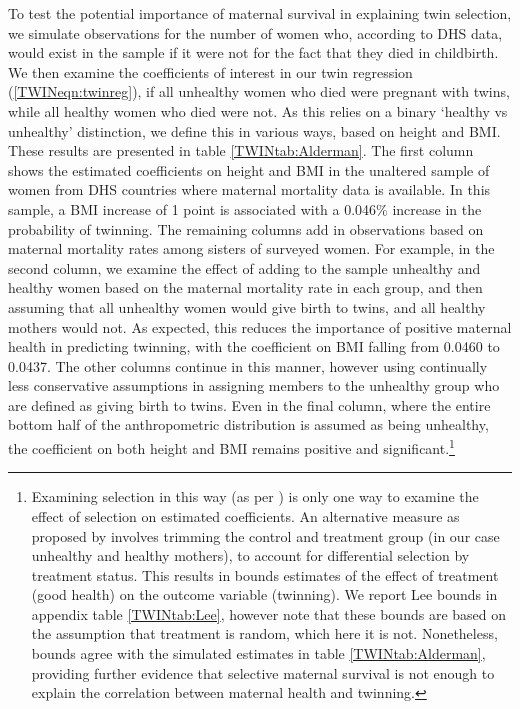 To test the potential importance of maternal survival in explaining twin 
selection, we simulate observations for the number of women who, according to 
DHS data, would exist in the sample if it were not for the fact that they died 
in childbirth.  We then examine the coefficients of interest in our twin 
regression (\ref{TWINeqn:twinreg}), if all unhealthy women who died were 
pregnant with twins, while all healthy women who died were not.  As this relies 
on a binary `healthy vs unhealthy' distinction, we define this in various ways, 
based on height and BMI.  These results are presented in table 
\ref{TWINtab:Alderman}.  The first column shows the estimated coefficients on 
height and BMI in the unaltered sample of women from DHS countries where 
maternal mortality data is available.  In this sample, a BMI increase of 1 
point is associated with a 0.046\% increase in the probability of twinning. The 
remaining columns add in observations based on maternal mortality rates among 
sisters of surveyed women.  For example, in the second column, we examine the 
effect of adding to the sample unhealthy and healthy women based on the maternal 
mortality rate in each group, and then assuming that all unhealthy women would 
give birth to twins, and all healthy mothers would not. As expected, this 
reduces the importance of positive maternal health in predicting twinning, with 
the coefficient on BMI falling from 0.0460 to 0.0437. The other columns continue 
in this manner, however using continually less conservative assumptions in 
assigning members to the unhealthy group who are defined as giving birth to 
twins. Even in the final column, where the entire bottom half of the 
anthropometric distribution is assumed as being unhealthy, the coefficient on 
both height and BMI remains positive and significant.\footnote{Examining 
selection in this way (as per \citet{Aldermanetal2011}) is only one way to 
examine the effect of selection on estimated coefficients.  An alternative 
measure as proposed by \citet{Lee2009} involves trimming the control and 
treatment group (in our case unhealthy and healthy mothers), to account for 
differential selection by treatment status.  This results in bounds estimates 
of the effect of treatment (good health) on the outcome variable (twinning). We 
report Lee bounds in appendix table \ref{TWINtab:Lee}, however note that these 
bounds are based on the assumption that treatment is random, which here it is 
not.  Nonetheless, \citet{Lee2009} bounds agree with the simulated estimates in 
table \ref{TWINtab:Alderman}, providing further evidence that selective maternal 
survival is not enough to explain the correlation between maternal health and 
twinning.}

